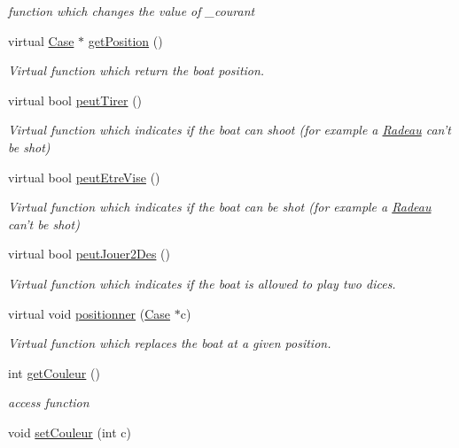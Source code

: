 \begin{DoxyCompactItemize}
\begin{DoxyCompactList}\small\item\em function which changes the value of \_\-courant \item\end{DoxyCompactList}\item 
virtual \hyperlink{class_case}{Case} $\ast$ \hyperlink{class_bateau_a00e5eb0670be5733773f62dc35d6df51}{getPosition} ()
\begin{DoxyCompactList}\small\item\em Virtual function which return the boat position. \item\end{DoxyCompactList}\item 
virtual bool \hyperlink{class_bateau_a4e83c9f8829d9124aa228553983dde30}{peutTirer} ()
\begin{DoxyCompactList}\small\item\em Virtual function which indicates if the boat can shoot (for example a \hyperlink{class_radeau}{Radeau} can't be shot) \item\end{DoxyCompactList}\item 
virtual bool \hyperlink{class_bateau_a8034d2fb0cd3a77006d8cb93760bd052}{peutEtreVise} ()
\begin{DoxyCompactList}\small\item\em Virtual function which indicates if the boat can be shot (for example a \hyperlink{class_radeau}{Radeau} can't be shot) \item\end{DoxyCompactList}\item 
virtual bool \hyperlink{class_bateau_a2199cb19284ff581d27249d275b68c10}{peutJouer2Des} ()
\begin{DoxyCompactList}\small\item\em Virtual function which indicates if the boat is allowed to play two dices. \item\end{DoxyCompactList}\item 
virtual void \hyperlink{class_bateau_a4c8f0eed80f8222f52c10a28ffc1e23e}{positionner} (\hyperlink{class_case}{Case} $\ast$c)
\begin{DoxyCompactList}\small\item\em Virtual function which replaces the boat at a given position. \item\end{DoxyCompactList}\item 
int \hyperlink{class_bateau_ac9f4ecda05764e72d12119c1574c57a4}{getCouleur} ()
\begin{DoxyCompactList}\small\item\em access function \item\end{DoxyCompactList}\item 
\hypertarget{class_bateau_a6302c6313fc1806a2fcaf16424d3e989}{
void \hyperlink{class_bateau_a6302c6313fc1806a2fcaf16424d3e989}{setCouleur} (int c)}
\label{class_bateau_a6302c6313fc1806a2fcaf16424d3e989}


\end{DoxyCompactItemize}
